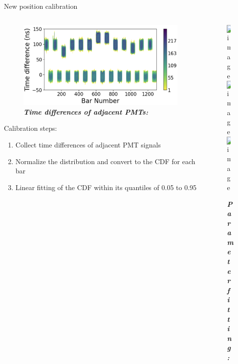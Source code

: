 \documentclass{ikpKoeln}
\begin{document}
\begin{frame}[t]{New position calibration}
	\vspace {-2.5em}
	\begin{columns}[t]
		\begin{column}{0.45 \textwidth}
			\begin{figure}
				\captionsetup{singlelinecheck=off}
				\caption*{\textit{\textbf{Time differences of adjacent PMTs:}}}
				\vspace{-0.5em}
				\includegraphics[width = \textwidth]{neuland/TimeDiffDist.png}
			\end{figure}
			\vspace{-1em}
			\begin{block}{Calibration steps:}
				\begin{enumerate}
					\setlength\itemsep{0em}
					\item<1-> Collect time differences of adjacent PMT signals
					\item<2-> Normalize the distribution and convert to the CDF for each bar
					\item<3-> Linear fitting of the CDF within its quantiles of 0.05 to 0.95
				\end{enumerate}
			\end{block}
		\end{column}
		\begin{column}{0.45 \textwidth}
			\begin{figure}
				\captionsetup{singlelinecheck=off}
				\caption*{\textit{\textbf{Parameter fitting:}}}
				\vspace*{-0.5em}
				\includegraphics<1>[width = 0.9\textwidth]{neuland/position_cal/TimeDifference2.png}
				\includegraphics<2>[width = 0.9\textwidth]{neuland/position_cal/TimeDifference3.png}
				\includegraphics<3>[width = 0.9\textwidth]{neuland/position_cal/TimeDifference4.png}
			\end{figure}

\end{column}
\end{columns}
\end{frame}
\end{document}
